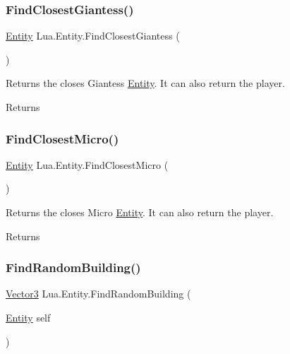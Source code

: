 \subsubsection{\texorpdfstring{FindClosestGiantess()}{FindClosestGiantess()}}
{\footnotesize\ttfamily \mbox{\hyperlink{class_lua_1_1_entity}{Entity}} Lua.\+Entity.\+Find\+Closest\+Giantess (\begin{DoxyParamCaption}{ }\end{DoxyParamCaption})}



Returns the closes Giantess \mbox{\hyperlink{class_lua_1_1_entity}{Entity}}. It can also return the player. 

\begin{DoxyReturn}{Returns}

\end{DoxyReturn}
\mbox{\label{class_lua_1_1_entity_a2e06bf904c49f705ac361e1538365e2e}} 
\subsubsection{\texorpdfstring{FindClosestMicro()}{FindClosestMicro()}}
{\footnotesize\ttfamily \mbox{\hyperlink{class_lua_1_1_entity}{Entity}} Lua.\+Entity.\+Find\+Closest\+Micro (\begin{DoxyParamCaption}{ }\end{DoxyParamCaption})}



Returns the closes Micro \mbox{\hyperlink{class_lua_1_1_entity}{Entity}}. It can also return the player. 

\begin{DoxyReturn}{Returns}

\end{DoxyReturn}
\mbox{\label{class_lua_1_1_entity_a72e0a626a062ba116cf62cfeb77f87f8}} 
\subsubsection{\texorpdfstring{FindRandomBuilding()}{FindRandomBuilding()}}
{\footnotesize\ttfamily \mbox{\hyperlink{class_lua_1_1_vector3}{Vector3}} Lua.\+Entity.\+Find\+Random\+Building (\begin{DoxyParamCaption}\item[{\mbox{\hyperlink{class_lua_1_1_entity}{Entity}}}]{self }\end{DoxyParamCaption})}



